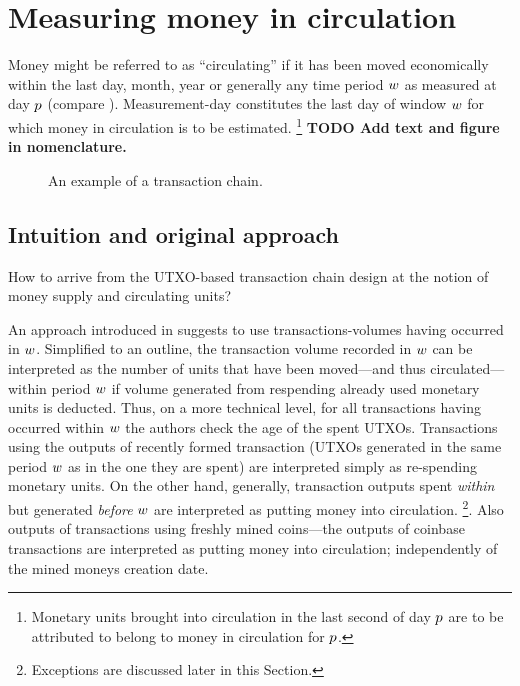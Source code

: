 \section{Measuring money in circulation}
\label{sec:measure}%

Money might be referred to as ``circulating'' if it has been moved economically within the last day, month, year or generally any time period ${w}$ as measured at day \({p}\) (compare \citep{pernice2019cryptocurrencies}). %
Measurement-day constitutes the last day of window \({w}\) for which money in circulation is to be estimated.%
\footnote{Monetary units brought into circulation in the last second of day \({p}\) are to be attributed to belong to money in circulation for \({p}\). }%
\textbf{TODO Add text and figure in nomenclature.}

\begin{figure}[ht!]%
	\centering
	\ifdefined\varInputFigs%
	
	\else%
	\fi%
	\caption{%
		An example of a transaction chain. %
	}%
	\label{fig:mcirc_concept}%
\end{figure}%


\subsection{Intuition and original approach}
\label{sec:orig_approach}%

How to arrive from the UTXO-based transaction chain design at the notion of money supply and circulating units? %

An approach introduced in \cite{pernice2019cryptocurrencies} suggests to use transactions-volumes having occurred in ${w}$. %
Simplified to an outline, the transaction volume recorded in \({w}\) can be interpreted as the number of units that have been moved---and thus circulated---within period \({w}\) if volume generated from respending already used monetary units is deducted. %
Thus, on a more technical level, for all transactions having occurred within \({w}\) the authors check the age of the spent UTXOs. %
Transactions using the outputs of recently formed transaction (UTXOs generated in the same period \({w}\) as in the one they are spent) are interpreted simply as re-spending monetary units. %
On the other hand, generally, transaction outputs spent \emph{within} but generated \emph{before} \({w}\) are interpreted as putting money into circulation.%
\footnote{Exceptions are discussed later in this Section.}. %
Also outputs of transactions using freshly mined coins---the outputs of coinbase transactions are interpreted as putting money into circulation; independently of the mined moneys creation date. %

